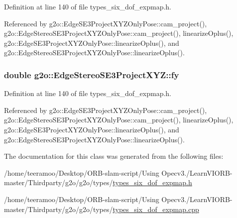 Definition at line 140 of file types\+\_\+six\+\_\+dof\+\_\+expmap.\+h.



Referenced by g2o\+::\+Edge\+S\+E3\+Project\+X\+Y\+Z\+Only\+Pose\+::cam\+\_\+project(), g2o\+::\+Edge\+Stereo\+S\+E3\+Project\+X\+Y\+Z\+Only\+Pose\+::cam\+\_\+project(), linearize\+Oplus(), g2o\+::\+Edge\+S\+E3\+Project\+X\+Y\+Z\+Only\+Pose\+::linearize\+Oplus(), and g2o\+::\+Edge\+Stereo\+S\+E3\+Project\+X\+Y\+Z\+Only\+Pose\+::linearize\+Oplus().

\subsubsection[{\texorpdfstring{fy}{fy}}]{\setlength{\rightskip}{0pt plus 5cm}double g2o\+::\+Edge\+Stereo\+S\+E3\+Project\+X\+Y\+Z\+::fy}\hypertarget{classg2o_1_1EdgeStereoSE3ProjectXYZ_a4e5b984e84437680b1f589822b4c0700}{}\label{classg2o_1_1EdgeStereoSE3ProjectXYZ_a4e5b984e84437680b1f589822b4c0700}


Definition at line 140 of file types\+\_\+six\+\_\+dof\+\_\+expmap.\+h.



Referenced by g2o\+::\+Edge\+S\+E3\+Project\+X\+Y\+Z\+Only\+Pose\+::cam\+\_\+project(), g2o\+::\+Edge\+Stereo\+S\+E3\+Project\+X\+Y\+Z\+Only\+Pose\+::cam\+\_\+project(), linearize\+Oplus(), g2o\+::\+Edge\+S\+E3\+Project\+X\+Y\+Z\+Only\+Pose\+::linearize\+Oplus(), and g2o\+::\+Edge\+Stereo\+S\+E3\+Project\+X\+Y\+Z\+Only\+Pose\+::linearize\+Oplus().



The documentation for this class was generated from the following files\+:\begin{DoxyCompactItemize}
\item 
/home/teeramoo/\+Desktop/\+O\+R\+B-\/slam-\/script/\+Using Opecv3./\+Learn\+V\+I\+O\+R\+B-\/master/\+Thirdparty/g2o/g2o/types/\hyperlink{types__six__dof__expmap_8h}{types\+\_\+six\+\_\+dof\+\_\+expmap.\+h}\item 
/home/teeramoo/\+Desktop/\+O\+R\+B-\/slam-\/script/\+Using Opecv3./\+Learn\+V\+I\+O\+R\+B-\/master/\+Thirdparty/g2o/g2o/types/\hyperlink{types__six__dof__expmap_8cpp}{types\+\_\+six\+\_\+dof\+\_\+expmap.\+cpp}\end{DoxyCompactItemize}
